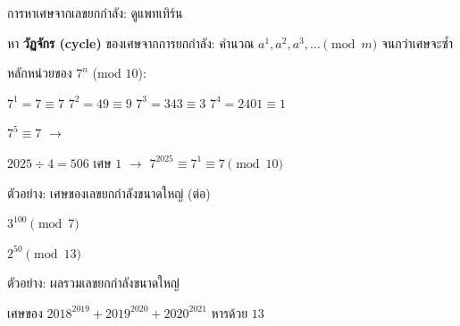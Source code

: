 \documentclass[11pt, aspectratio=169]{beamer}
\begin{document}
\begin{frame}{การหาเศษจากเลขยกกำลัง: ดูแพทเทิร์น}
  \begin{explanation}[แนวคิด]
    หา \textbf{วัฏจักร (cycle)} ของเศษจากการยกกำลัง:
    คำนวณ $a^1, a^2, a^3, \ldots \pmod{m}$ จนกว่าเศษจะซํ้า
  \end{explanation}

  \begin{exambox}
    หลักหน่วยของ $7^n$ (mod $10$):

    $7^1 = 7 \equiv 7$ \quad
    $7^2 = 49 \equiv 9$ \quad
    $7^3 = 343 \equiv 3$ \quad
    $7^4 = 2401 \equiv 1$

    $7^5 \equiv 7$ \quad $\rightarrow$ 

    $2025 \div 4 = 506$ เศษ $1$ \quad $\rightarrow$ \quad $7^{2025} \equiv 7^1 \equiv 7 \pmod{10}$

  \end{exambox}
\end{frame}

\begin{frame}[t]{ตัวอย่าง: เศษของเลขยกกำลังขนาดใหญ่ (ต่อ)}
  \begin{exambox}[โจทย์]
    $3^{100} \pmod{7}$
  \end{exambox}

  \vspace{\fill}

  \begin{exambox}[โจทย์]
    $2^{50} \pmod{13}$
  \end{exambox}

  \vspace{\fill}
\end{frame}

\begin{frame}[t]{ตัวอย่าง: ผลรวมเลขยกกำลังขนาดใหญ่}
  \begin{exambox}[โจทย์]
    เศษของ $2018^{2019} + 2019^{2020} + 2020^{2021}$ หารด้วย $13$
  \end{exambox}

  \vspace{\fill}
\end{frame}
\end{document}
